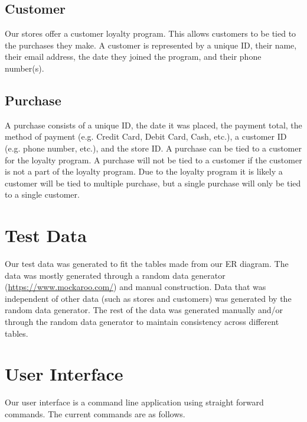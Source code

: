 \documentclass{article}
\begin{document}
		\subsection{Customer}
			Our stores offer a customer loyalty program. This allows customers to be
			tied to the purchases they make. A customer is represented by a unique ID,
			their name, their email address, the date they joined the program, and
			their phone number(s).

		\subsection{Purchase}
			A purchase consists of a unique ID, the date it was placed, the payment
			total, the method of payment (e.g. Credit Card, Debit Card, Cash, etc.), a
			customer ID (e.g. phone number, etc.), and the store ID. A purchase can
			be tied to a customer for the loyalty program. A purchase will not be
			tied to a customer if the customer is not a part of the loyalty program.
			Due to the loyalty program it is likely a customer will be tied to
			multiple purchase, but a single purchase will only be tied to a
			single customer.



	\section{Test Data}
		Our test data was generated to fit the tables made from our ER diagram. The
		data was mostly generated through a random data generator
		(\url{https://www.mockaroo.com/}) and manual construction. Data that was
		independent of other data (such as stores and customers) was generated by
		the random data generator. The rest of the data was generated manually
		and/or through the random data generator to maintain consistency across
		different tables.

	\section{User Interface}
    Our user interface is a command line application using straight forward
    commands. The current commands are as follows.
\end{document}

